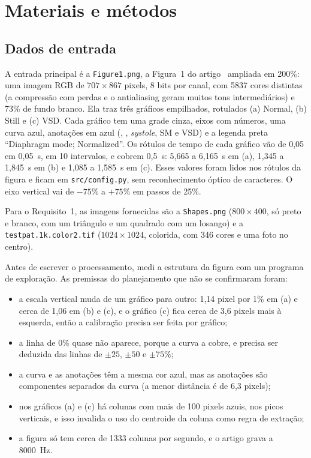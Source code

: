 \section{Materiais e métodos}

\subsection{Dados de entrada}

A entrada principal é a \texttt{Figure1.png}, a Figura~1 do artigo~\cite{tomas2011} ampliada em 200\%: uma imagem RGB de $707\times 867$ pixels, 8 bits por canal, com 5837 cores distintas (a compressão com perdas e o antialiasing geram muitos tons intermediários) e 73\% de fundo branco. Ela traz três gráficos empilhados, rotulados (a) Normal, (b) Still e (c) VSD. Cada gráfico tem uma grade cinza, eixos com números, uma curva azul, anotações em azul (\Sone, \Stwo, \emph{systole}, SM e VSD) e a legenda preta ``Diaphragm mode; Normalized''. Os rótulos de tempo de cada gráfico vão de 0,05 em 0,05~s, em 10 intervalos, e cobrem 0,5~s: 5,665 a 6,165~s em (a), 1,345 a 1,845~s em (b) e 1,085 a 1,585~s em (c). Esses valores foram lidos nos rótulos da figura e ficam em \texttt{src/config.py}, sem reconhecimento óptico de caracteres. O eixo vertical vai de $-75\%$ a $+75\%$ em passos de 25\%.

Para o Requisito~1, as imagens fornecidas são a \texttt{Shapes.png} ($800\times 400$, só preto e branco, com um triângulo e um quadrado com um losango) e a \texttt{testpat.1k.color2.tif} ($1024\times 1024$, colorida, com 346 cores e uma foto no centro).

Antes de escrever o processamento, medi a estrutura da figura com um programa de exploração. As premissas do planejamento que não se confirmaram foram:
\begin{itemize}
\item a escala vertical muda de um gráfico para outro: 1,14 pixel por 1\% em (a) e cerca de 1,06 em (b) e (c), e o gráfico (c) fica cerca de 3,6 pixels mais à esquerda, então a calibração precisa ser feita por gráfico;
\item a linha de 0\% quase não aparece, porque a curva a cobre, e precisa ser deduzida das linhas de $\pm25$, $\pm50$ e $\pm75\%$;
\item a curva e as anotações têm a mesma cor azul, mas as anotações são componentes separados da curva (a menor distância é de 6,3 pixels);
\item nos gráficos (a) e (c) há colunas com mais de 100 pixels azuis, nos picos verticais, e isso invalida o uso do centroide da coluna como regra de extração;
\item a figura só tem cerca de 1333 colunas por segundo, e o artigo grava a 8000~Hz.
\end{itemize}

